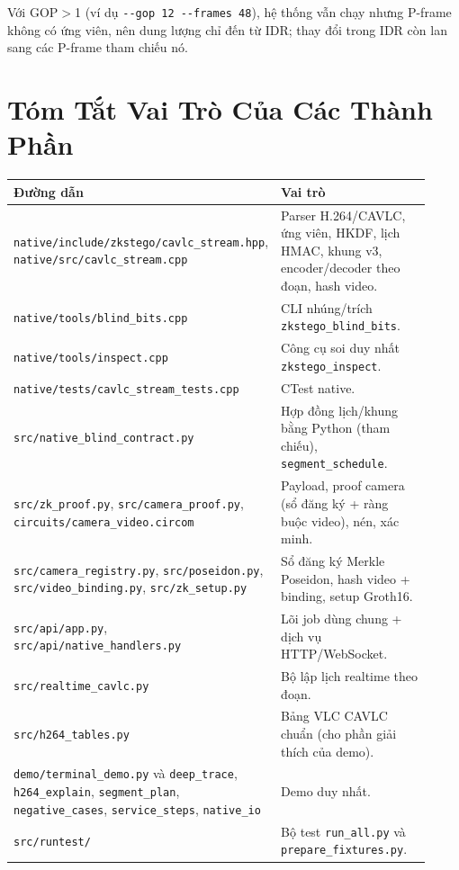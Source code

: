 \documentclass[11pt,a4paper]{article}
\begin{document}
Với GOP\(>\)1 (ví dụ \texttt{-{}-gop 12 -{}-frames 48}), hệ thống vẫn chạy nhưng
P-frame không có ứng viên, nên dung lượng chỉ đến từ IDR; thay đổi trong IDR còn lan
sang các P-frame tham chiếu nó.

\section{Tóm Tắt Vai Trò Của Các Thành Phần}

\begin{center}
\small
\begin{tabular}{p{0.38\linewidth}p{0.54\linewidth}}
\toprule
Đường dẫn & Vai trò \\
\midrule
\nolinkurl{native/include/zkstego/cavlc_stream.hpp}, \nolinkurl{native/src/cavlc_stream.cpp} &
Parser H.264/CAVLC, ứng viên, HKDF, lịch HMAC, khung v3, encoder/decoder theo đoạn, hash video. \\
\texttt{native/tools/blind\_bits.cpp} & CLI nhúng/trích \texttt{zkstego\_blind\_bits}. \\
\texttt{native/tools/inspect.cpp} & Công cụ soi duy nhất \texttt{zkstego\_inspect}. \\
\nolinkurl{native/tests/cavlc_stream_tests.cpp} & CTest native. \\
\texttt{src/native\_blind\_contract.py} & Hợp đồng lịch/khung bằng Python (tham chiếu), \texttt{segment\_schedule}. \\
\nolinkurl{src/zk_proof.py}, \nolinkurl{src/camera_proof.py}, \nolinkurl{circuits/camera_video.circom} & Payload, proof camera (sổ đăng ký + ràng buộc video), nén, xác minh. \\
\nolinkurl{src/camera_registry.py}, \nolinkurl{src/poseidon.py}, \nolinkurl{src/video_binding.py}, \nolinkurl{src/zk_setup.py} & Sổ đăng ký Merkle Poseidon, hash video + binding, setup Groth16. \\
\nolinkurl{src/api/app.py}, \nolinkurl{src/api/native_handlers.py} & Lõi job dùng chung + dịch vụ HTTP/WebSocket. \\
\texttt{src/realtime\_cavlc.py} & Bộ lập lịch realtime theo đoạn. \\
\texttt{src/h264\_tables.py} & Bảng VLC CAVLC chuẩn (cho phần giải thích của demo). \\
\texttt{demo/terminal\_demo.py} và \texttt{deep\_trace}, \texttt{h264\_explain}, \texttt{segment\_plan}, \texttt{negative\_cases}, \texttt{service\_steps}, \texttt{native\_io} & Demo duy nhất. \\
\texttt{src/runtest/} & Bộ test \texttt{run\_all.py} và \texttt{prepare\_fixtures.py}. \\
\bottomrule
\end{tabular}
\end{center}
\end{document}
